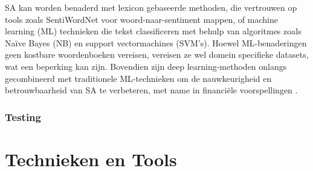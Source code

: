 SA kan worden benaderd met lexicon gebaseerde methoden, die vertrouwen op tools zoals SentiWordNet voor woord-naar-sentiment mappen, of machine learning (ML) technieken die tekst classificeren met behulp van algoritmes zoals Naïve Bayes (NB) en support vectormachines (SVM's). Hoewel ML-benaderingen geen kostbare woordenboeken vereisen, vereisen ze wel domein specifieke datasets, wat een beperking kan zijn. Bovendien zijn deep learning-methoden onlangs gecombineerd met traditionele ML-technieken om de nauwkeurigheid en betrouwbaarheid van SA te verbeteren, met name in financiële voorspellingen \autocite{Gupta2020}.


\subsubsection{Testing}













\section{Technieken en Tools}
